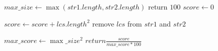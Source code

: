 \begin{algorithmic}[1]

\State $max\_size \gets \max(str1.length, str2.length)$
	\State return $100$
\EndIf
\State $score \gets 0$

	\State $score \gets score + lcs.length^2 $
	\State remove $lcs$ from $str1$ and $str2$
\EndWhile

\State $max\_score \gets \max\_size^2$
\State $return \frac{score}{max\_score * 100} $

\EndFunction
\end{algorithmic}